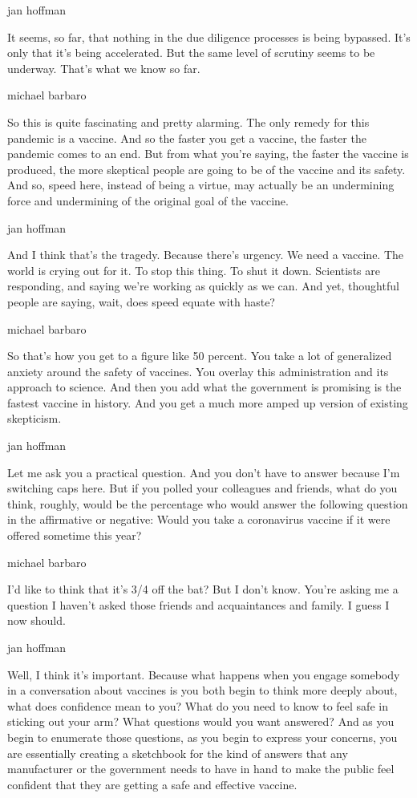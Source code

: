 jan hoffman

It seems, so far, that nothing in the due diligence processes is being
bypassed. It's only that it's being accelerated. But the same level of
scrutiny seems to be underway. That's what we know so far.

michael barbaro

So this is quite fascinating and pretty alarming. The only remedy for
this pandemic is a vaccine. And so the faster you get a vaccine, the
faster the pandemic comes to an end. But from what you're saying, the
faster the vaccine is produced, the more skeptical people are going to
be of the vaccine and its safety. And so, speed here, instead of being a
virtue, may actually be an undermining force and undermining of the
original goal of the vaccine.

jan hoffman

And I think that's the tragedy. Because there's urgency. We need a
vaccine. The world is crying out for it. To stop this thing. To shut it
down. Scientists are responding, and saying we're working as quickly as
we can. And yet, thoughtful people are saying, wait, does speed equate
with haste?

michael barbaro

So that's how you get to a figure like 50 percent. You take a lot of
generalized anxiety around the safety of vaccines. You overlay this
administration and its approach to science. And then you add what the
government is promising is the fastest vaccine in history. And you get a
much more amped up version of existing skepticism.

jan hoffman

Let me ask you a practical question. And you don't have to answer
because I'm switching caps here. But if you polled your colleagues and
friends, what do you think, roughly, would be the percentage who would
answer the following question in the affirmative or negative: Would you
take a coronavirus vaccine if it were offered sometime this year?

michael barbaro

I'd like to think that it's 3/4 off the bat? But I don't know. You're
asking me a question I haven't asked those friends and acquaintances and
family. I guess I now should.

jan hoffman

Well, I think it's important. Because what happens when you engage
somebody in a conversation about vaccines is you both begin to think
more deeply about, what does confidence mean to you? What do you need to
know to feel safe in sticking out your arm? What questions would you
want answered? And as you begin to enumerate those questions, as you
begin to express your concerns, you are essentially creating a
sketchbook for the kind of answers that any manufacturer or the
government needs to have in hand to make the public feel confident that
they are getting a safe and effective vaccine.

